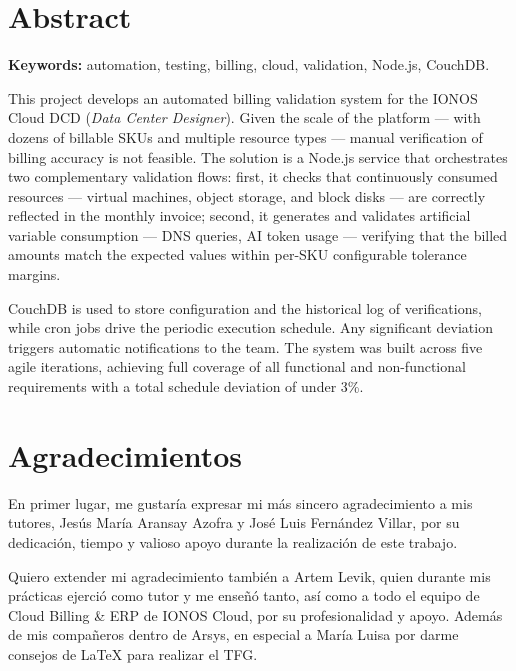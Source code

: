 \documentclass[a4paper,11pt,twoside]{report}
\begin{document}
\vspace{2cm}

\chapter*{Abstract}
\thispagestyle{empty}

\textbf{Keywords:} automation, testing, billing, cloud, validation, Node.js, CouchDB.

\vspace{0.5cm}

This project develops an automated billing validation system for the IONOS Cloud DCD (\textit{Data Center Designer}). Given the scale of the platform — with dozens of billable SKUs and multiple resource types — manual verification of billing accuracy is not feasible. The solution is a Node.js service that orchestrates two complementary validation flows: first, it checks that continuously consumed resources — virtual machines, object storage, and block disks — are correctly reflected in the monthly invoice; second, it generates and validates artificial variable consumption — DNS queries, AI token usage — verifying that the billed amounts match the expected values within per-SKU configurable tolerance margins.

CouchDB is used to store configuration and the historical log of verifications, while cron jobs drive the periodic execution schedule. Any significant deviation triggers automatic notifications to the team. The system was built across five agile iterations, achieving full coverage of all functional and non-functional requirements with a total schedule deviation of under 3\%.

\vspace{2cm}

\newpage

\chapter*{Agradecimientos}
\thispagestyle{empty}

En primer lugar, me gustaría expresar mi más sincero agradecimiento a mis tutores, Jesús María Aransay Azofra y José Luis Fernández Villar, por su dedicación, tiempo y valioso apoyo durante la realización de este trabajo.

Quiero extender mi agradecimiento también a Artem Levik, quien durante mis prácticas ejerció como tutor y me enseñó tanto, así como a todo el equipo de Cloud Billing \& ERP de IONOS Cloud, por su profesionalidad y apoyo. Además de mis compañeros dentro de Arsys, en especial a María Luisa por darme consejos de LaTeX para realizar el TFG.
\end{document}
